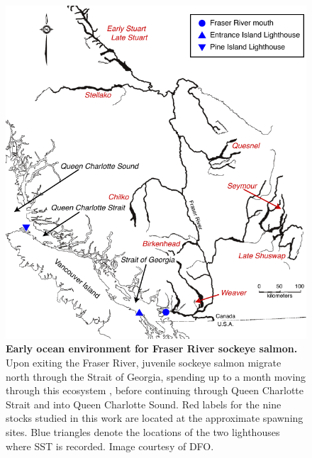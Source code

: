 \begin{figure}[!ht]
\begin{center}\includegraphics[width=\maxwidth{\textwidth}]{fig_salmon_3.pdf}\end{center}
\caption[Early ocean environment for Fraser River sockeye salmon.]{\textbf{Early ocean environment for Fraser River sockeye salmon.}\newline
Upon exiting the Fraser River, juvenile sockeye salmon migrate north through the Strait of Georgia, spending up to a month moving through this ecosystem \cite{Preikshot_2012}, before continuing through Queen Charlotte Strait and into Queen Charlotte Sound. Red labels for the nine stocks studied in this work are located at the approximate spawning sites. Blue triangles denote the locations of the two lighthouses where SST is recorded. Image courtesy of DFO.}
\label{fig_salmon_map}
\end{figure}

